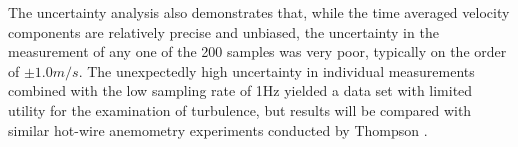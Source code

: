 \documentclass[12pt]{report}
\begin{document}
The uncertainty analysis also demonstrates that, while the time averaged 
velocity components are relatively precise and unbiased, the uncertainty in the 
measurement of any one of the 200 samples was very poor, typically on the order 
of $\pm 1.0 m/s$. The unexpectedly high uncertainty in individual measurements 
combined with the low sampling rate of 1Hz yielded a data set with limited 
utility for the examination of turbulence, but results will be compared with 
similar hot-wire anemometry experiments conducted by Thompson 
\cite{thompson2016}.










\begin{thebibliography}{99}

\end{thebibliography}


\appendix

%	

\newpage

\vitapage
\end{document}
